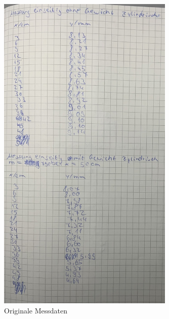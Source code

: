 \begin{figure}
    \centering
    \includegraphics[width=0.75\textwidth]{Dateien/Bild4.jpeg}
    \caption{Originale Messdaten}
    \label{fig:daten4}
\end{figure}